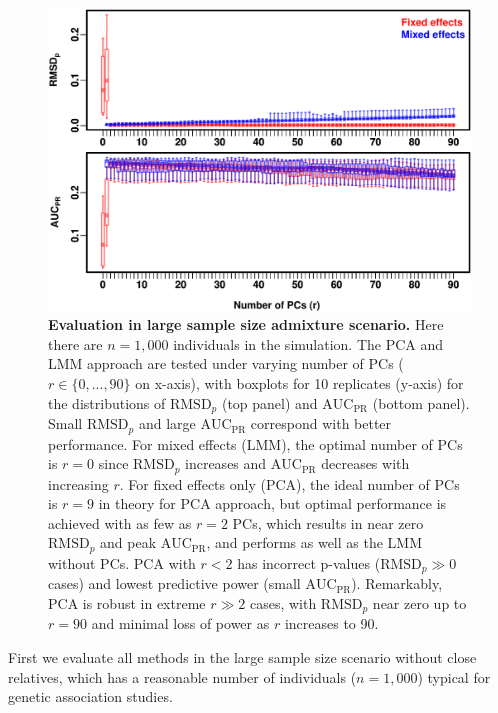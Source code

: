 \documentclass[11pt]{article}
\newcommand{\rmsd}{\text{RMSD}_p}
\newcommand{\auc}{\text{AUC}_\text{PR}}
\begin{document}
\begin{figure}[bp!]
  \centering
  \includegraphics[width=6in]{boxplot_n_1000.pdf}
  \caption{
    {\bf Evaluation in large sample size admixture scenario.}
    Here there are $n = 1,000$ individuals in the simulation.
    The PCA and LMM approach are tested under varying number of PCs ($r \in \{0, ..., 90\}$ on x-axis), with boxplots for 10 replicates (y-axis) for the distributions of $\rmsd$ (top panel) and $\auc$ (bottom panel).
    Small $\rmsd$ and large $\auc$ correspond with better performance.
    For mixed effects (LMM), the optimal number of PCs is $r=0$ since $\rmsd$ increases and $\auc$ decreases with increasing $r$.
    For fixed effects only (PCA), the ideal number of PCs is $r = 9$ in theory for PCA approach, but optimal performance is achieved with as few as $r = 2$ PCs, which results in near zero $\rmsd$ and peak $\auc$, and performs as well as the LMM without PCs.
    PCA with $r < 2$ has incorrect p-values ($\rmsd \gg 0$ cases) and lowest predictive power (small $\auc$).
    Remarkably, PCA is robust in extreme $r \gg 2$ cases, with $\rmsd$ near zero up to $r = 90$ and minimal loss of power as $r$ increases to 90.
  }
  \label{fig:large_sample_size}
\end{figure}

First we evaluate all methods in the large sample size scenario without close relatives, which has a reasonable number of individuals ($n = 1,000$) typical for genetic association studies.
\end{document}
